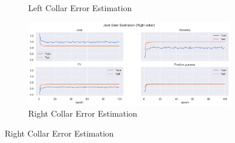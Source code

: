 \begin{figure}[!ht]
\begin{subfigure}[b]{0.47\linewidth}
        \caption{Left Collar Error Estimation}
        \label{fig:v2_leco_jt_ee}
    \end{subfigure}
    \hfill
    \begin{subfigure}[b]{0.47\linewidth}
        \centering
        \includegraphics[width=\textwidth]{figures/Results/v2_bs_40_is_64_e_100/jt/Right collar_ErrorEstimation.png}
        \caption{Right Collar Error Estimation}
        \label{fig:v2_rico_jt_ee}
    \end{subfigure}
  \end{figure}
  
